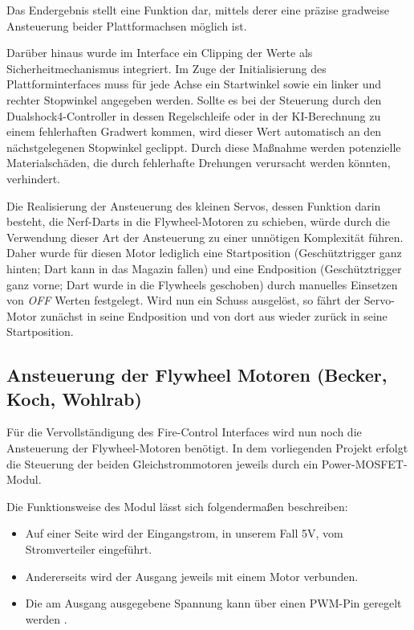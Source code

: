Das Endergebnis stellt eine Funktion dar, mittels derer eine präzise gradweise Ansteuerung beider Plattformachsen möglich ist.

Darüber hinaus wurde im Interface ein Clipping der Werte als Sicherheitmechanismus integriert. Im Zuge der Initialisierung des Plattforminterfaces muss für jede Achse ein Startwinkel sowie ein linker und rechter Stopwinkel angegeben werden.
Sollte es bei der Steuerung durch den Dualshock4-Controller in dessen Regelschleife oder in der KI-Berechnung zu einem fehlerhaften Gradwert kommen, wird dieser Wert automatisch an den nächstgelegenen Stopwinkel geclippt. 
Durch diese Maßnahme werden potenzielle Materialschäden, die durch fehlerhafte Drehungen verursacht werden könnten, verhindert.

Die Realisierung der Ansteuerung des kleinen Servos, dessen Funktion darin besteht, die Nerf-Darts in die Flywheel-Motoren zu schieben, würde durch die Verwendung dieser Art der Ansteuerung zu einer unnötigen Komplexität führen.
Daher wurde für diesen Motor lediglich eine Startposition (Geschütztrigger ganz hinten; Dart kann in das Magazin fallen) und eine Endposition (Geschütztrigger ganz vorne; Dart wurde in die Flywheels geschoben) durch manuelles Einsetzen von \textit{OFF} Werten festgelegt.
Wird nun ein Schuss ausgelöst, so fährt der Servo-Motor zunächst in seine Endposition und von dort aus wieder zurück in seine Startposition.

\subsection{Ansteuerung der Flywheel Motoren (Becker, Koch, Wohlrab)}

Für die Vervollständigung des Fire-Control Interfaces wird nun noch die Ansteuerung der Flywheel-Motoren benötigt.
In dem vorliegenden Projekt erfolgt die Steuerung der beiden Gleichstrommotoren jeweils durch ein Power-MOSFET-Modul.

Die Funktionsweise des Modul lässt sich folgendermaßen beschreiben:

\begin{itemize}
    \item Auf einer Seite wird der Eingangstrom, in unserem Fall 5V, vom Stromverteiler eingeführt.
    \item Andererseits wird der Ausgang jeweils mit einem Motor verbunden.
    \item Die am Ausgang ausgegebene Spannung kann über einen PWM-Pin geregelt werden \cite{esp_platform_flywheel_motor}.
\end{itemize}

